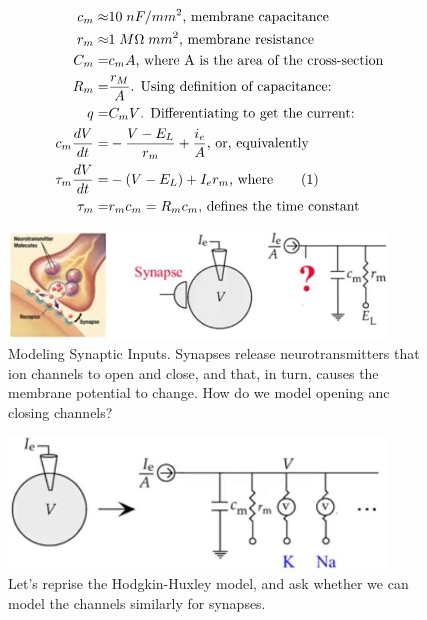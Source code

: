 \documentclass[]{article}
\newcommand\numberthis{\addtocounter{equation}{1}\tag{\theequation}}
\begin{document}
\begin{align*}
	c_m  \approx& 10 \; nF/mm^2 \text{, membrane capacitance}\\
	r_m \approx& 1 \; M \Omega \; mm^2 \text{, membrane resistance}\\
	C_m =& c_m A \text{, where A is the area of the cross-section}\\
	R_m =& \frac{r_M}{A} \text{. Using definition of capacitance:}\\
	q =& C_m V \text{. Differentiating to get the current:}\\
	c_m \frac{dV}{dt} =&-\frac{V-E_L}{r_m} + \frac{i_e}{A} \text{, or, equivalently}\\
	\tau_m \frac{dV}{dt} =& -(V-E_L) + I_e r_m \text{, where} \numberthis \label{eq:rc:equivalent}\\
	\tau_m =& r_m c_m = R_m c_m \text{, defines the time constant}
\end{align*}

\begin{figure}[H]
	\caption[Modeling Synaptic Inputs]{Modeling Synaptic Inputs. Synapses release neurotransmitters that  ion channels to open and close, and that, in turn, causes the membrane potential to change. How do we model opening anc closing channels?}
	\includegraphics[width=0.9\textwidth]{how-to-model-synapse}
\end{figure}

\begin{figure}[H]
	\caption[Reprise the Hodgkin-Huxley model]{Let's reprise the Hodgkin-Huxley model, and ask whether we can model the channels similarly for synapses.}
	\includegraphics[width=0.9\textwidth]{hodgkin-huxley-reprise}
\end{figure}
\end{document}
